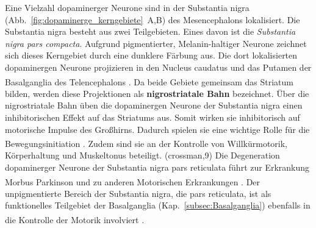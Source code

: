 \documentclass[12pt,a4paper,pdftex]{article}
\begin{document}
Eine Vielzahl dopaminerger Neurone sind in der Substantia nigra (Abb.~\ref{fig:dopaminerge_kerngebiete}~A,B) des Mesencephalons lokalisiert.
Die Substantia nigra besteht aus zwei Teilgebieten. Eines davon ist die \textit{Substantia nigra pars compacta}. 
Aufgrund pigmentierter, Melanin-haltiger Neurone zeichnet sich dieses Kerngebiet durch eine dunklere Färbung aus.
Die dort lokalisierten dopaminergen Neurone projizieren in den Nucleus caudatus und das Putamen der Basalganglia des Telencephalons \textsuperscript{\cite[9]{crossman2014neuroanatomy}}.
Da beide Gebiete gemeinsam das Striatum bilden, werden diese Projektionen als \textbf{nigrostriatale Bahn}  bezeichnet.
Über die nigrostriatale Bahn üben die dopaminergen Neurone der Substantia nigra einen inhibitorischen Effekt auf das Striatums aus. Somit wirken sie inhibitorisch auf motorische Impulse des Großhirns.
Dadurch spielen sie eine wichtige Rolle für die Bewegungsinitiation \textsuperscript{\cite[6]{trepel2011neuroanatomie}}.
Zudem sind sie an der Kontrolle von Willkürmotorik, Körperhaltung und Muskeltonus beteiligt. (crossman,9)
Die Degeneration dopaminerger Neurone der Substantia nigra pars reticulata führt zur Erkrankung Morbus Parkinson \textsuperscript{\cite[9]{crossman2014neuroanatomy}} und zu anderen Motorischen Erkrankungen \textsuperscript{\cite[13]{kandel2013principles}}.
Der unpigmentierte Bereich der Substantia nigra, die pars reticulata, ist als funktionelles Teilgebiet der Basalganglia (Kap.~\ref{subsec:Basalganglia}) ebenfalls in die Kontrolle der Motorik involviert \textsuperscript{\cite[9]{crossman2014neuroanatomy}}.
\end{document}
